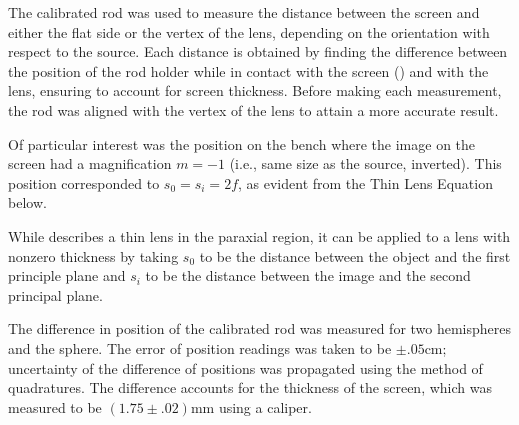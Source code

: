 \begin{paper}
	The calibrated rod was used to measure the distance between the screen and either the flat side or the vertex of the lens, depending on the orientation with respect to the source. Each distance is obtained by finding the difference between the position of the rod holder while in contact with the screen (\figSetup) and with the lens, ensuring to account for screen thickness. Before making each measurement, the rod was aligned with the vertex of the lens to attain a more accurate result.
	
	Of particular interest was the position on the bench where the image on the screen had a magnification \( m = -1 \) (i.e., same size as the source, inverted). This position corresponded to \( s_0 = s_i = 2f \), as evident from the Thin Lens Equation below.
	\begin{paperwhere}
	\end{paperwhere}

	While \eqThinLensEquation describes a thin lens in the paraxial region, it can be applied to a lens with nonzero thickness by taking \( s_0 \) to be the distance between the object and the first principle plane and \( s_i \) to be the distance between the image and the second principal plane.
	

	The difference in position of the calibrated rod was measured for two hemispheres and the sphere. The error of position readings was taken to be \( \pm .05 \si{\cm} \); uncertainty of the difference of positions was propagated using the method of quadratures. The difference accounts for the thickness of the screen, which was measured to be \( (1.75 \pm .02) \si{\mm} \) using a caliper. 

		

\end{paper}
